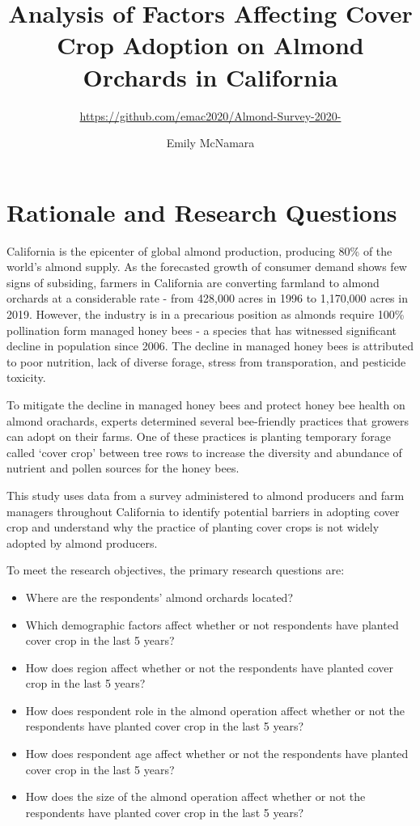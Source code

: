 \documentclass[12pt,]{article}
\title{Analysis of Factors Affecting Cover Crop Adoption on Almond Orchards in
California}
\subtitle{\url{https://github.com/emac2020/Almond-Survey-2020-}}
\author{Emily McNamara}
\date{}
\providecommand{\tightlist}{%
  \setlength{\itemsep}{0pt}\setlength{\parskip}{0pt}}
\begin{document}
\maketitle

\newpage

\tableofcontents  \newpage
\listoftables  \newpage
\listoffigures  \newpage

\section{Rationale and Research
Questions}\label{rationale-and-research-questions}

California is the epicenter of global almond production, producing 80\%
of the world's almond supply. As the forecasted growth of consumer
demand shows few signs of subsiding, farmers in California are
converting farmland to almond orchards at a considerable rate - from
428,000 acres in 1996 to 1,170,000 acres in 2019. However, the industry
is in a precarious position as almonds require 100\% pollination form
managed honey bees - a species that has witnessed significant decline in
population since 2006. The decline in managed honey bees is attributed
to poor nutrition, lack of diverse forage, stress from transporation,
and pesticide toxicity.

To mitigate the decline in managed honey bees and protect honey bee
health on almond orachards, experts determined several bee-friendly
practices that growers can adopt on their farms. One of these practices
is planting temporary forage called `cover crop' between tree rows to
increase the diversity and abundance of nutrient and pollen sources for
the honey bees.

This study uses data from a survey administered to almond producers and
farm managers throughout California to identify potential barriers in
adopting cover crop and understand why the practice of planting cover
crops is not widely adopted by almond producers.

To meet the research objectives, the primary research questions are:

\begin{itemize}
\tightlist
\item
  Where are the respondents' almond orchards located?
\item
  Which demographic factors affect whether or not respondents have
  planted cover crop in the last 5 years?
\item
  How does region affect whether or not the respondents have planted
  cover crop in the last 5 years?
\item
  How does respondent role in the almond operation affect whether or not
  the respondents have planted cover crop in the last 5 years?
\item
  How does respondent age affect whether or not the respondents have
  planted cover crop in the last 5 years?
\item
  How does the size of the almond operation affect whether or not the
  respondents have planted cover crop in the last 5 years?
\end{itemize}
\end{document}
